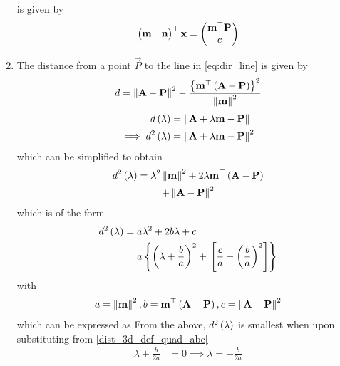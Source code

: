 \documentclass[journal,12pt,twocolumn]{IEEEtran}
\renewcommand\thesection{\arabic{section}}
\renewcommand\thesubsection{\thesection.\arabic{subsection}}
\begin{document}
\begin{enumerate}[label=\thesubsection.\arabic*.,ref=\thesubsection.\theenumi]
	is given by 
\begin{align}
	\begin{pmatrix} \mathbf{m} & \mathbf{n}\end{pmatrix}^{\top}\mathbf{x}= \begin{pmatrix}\mathbf{m}^{\top}\mathbf{P}\\ c \end{pmatrix}  
\end{align}
% 
\item The distance from a point $\vec{P}$  to the line in 
	\eqref{eq:dir_line} is given by 
\begin{align}
	\label{dist_3d_def_final}
		d = \left\lVert\mathbf{A} -\mathbf{P}\right\rVert^2 - \frac{\left\{\mathbf{m}^{\top}\left(\mathbf{A}-\mathbf{P} 
	\right)\right\}^2}{\left\lVert\mathbf{m}\right\rVert^2}
		\end{align}
		\solution 
\begin{align}
	\label{dist_3d_def}
	d\left(\lambda \right) &=\left\lVert\mathbf{A} + \lambda \mathbf{m}-\mathbf{P}\right\rVert
	\\
\implies 	d^2\left(\lambda \right) &=\left\lVert\mathbf{A} + \lambda \mathbf{m}-\mathbf{P}\right\rVert^2
\end{align}
which can be simplified to obtain 
	\begin{multline}
d^2\left(\lambda \right) =\lambda^2 \left\lVert\mathbf{m}\right\rVert^2+2\lambda \mathbf{m}^{\top}\left(\mathbf{A} 
		-\mathbf{P}\right)
		\\
		+\left\lVert\mathbf{A} -\mathbf{P}\right\rVert^2
	\end{multline}
which is of the form 
\begin{align}
	\label{dist_3d_def_quad}
	d^2\left(\lambda \right) &=a \lambda^2 + 2b\lambda +c
	\\
	&=a \left\{\left(\lambda+ \frac{b}{a}\right)^2 +{}\left[\frac{c}{a}-\left(\frac{b}{a}\right)^2 \right]\right\}
\end{align}
with 
\begin{align}
	\label{dist_3d_def_quad_abc}
	a = \left\lVert\mathbf{m}\right\rVert^2, b = \mathbf{m}^{\top}\left(\mathbf{A} 
		-\mathbf{P}\right), c = 
		\left\lVert\mathbf{A} -\mathbf{P}\right\rVert^2
\end{align}
which can be expressed as 
		From the above, $d^2\left(\lambda\right)$ is smallest when upon substituting from 
	\eqref{dist_3d_def_quad_abc}
\begin{align}
	\label{dist_3d_def_quad_small}
	\lambda+ \frac{b}{2a} &= 0 \implies \lambda = - \frac{b}{2a}

\end{align}
\end{enumerate}
\end{document}
